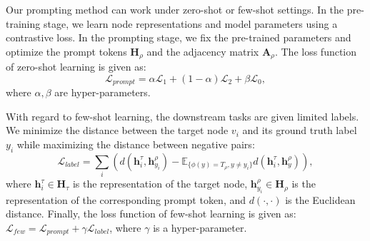 Our prompting method can work under zero-shot or few-shot settings. In the pre-training stage, we learn node representations and model parameters using a contrastive loss. In the prompting stage, we fix the pre-trained parameters and optimize the prompt tokens $\bm H_\rho$ and the adjacency matrix $\bm A_\rho$. The loss function of zero-shot learning is given as:
\begin{equation}\label{equ::overall}
	\mathcal{L}_{prompt} = \alpha \mathcal{L}_1 + (1-\alpha) \mathcal{L}_2 + \beta \mathcal{L}_0,
\end{equation}
where $\alpha,\beta$ are hyper-parameters.

With regard to few-shot learning, the downstream tasks are given limited labels. We minimize the distance between the target node $v_i$ and its ground truth label $y_i$ while maximizing the distance between negative pairs:
\begin{equation}
	\mathcal{L}_{label} = \sum_i \left( d(\bm h_i^\tau,\bm h_{y_i}^\rho) - \mathbb{E}_{\{\phi(y) = T_\rho, y \neq y_i\}} d(\bm h_i^\tau,\bm h_{y}^\rho) \right),
\end{equation}
where $\bm h_i^\tau \in \bm H_\tau$ is the representation of the target node, $\bm h_{y_i}^\rho \in \bm H_\rho$ is the representation of the corresponding prompt token, and $d(\cdot,\cdot)$ is the Euclidean distance. Finally, the loss function of few-shot learning is given as: $\mathcal{L}_{few} = \mathcal{L}_{prompt} + \gamma \mathcal{L}_{label}$, where $\gamma$ is a hyper-parameter.


